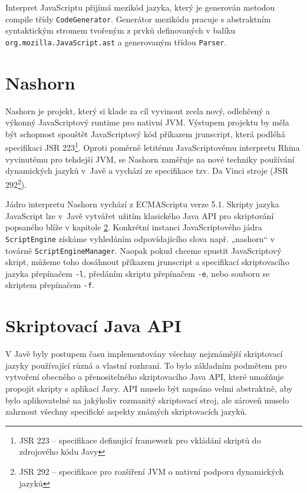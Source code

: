 Interpret JavaScriptu přijímá mezikód jazyka, který je generován metodou compile třídy \texttt{CodeGenerator}. Generátor mezikódu pracuje s abstraktním syntaktickým stromem tvořeným z prvků definovaných v balíku \texttt{org.mozilla.JavaScript.ast} a generovaným třídou \texttt{Parser}.

\section{Nashorn}
\label{Chapter.JavaScriptInJavaAnalysis.Nashorn}

Nashorn je projekt, který si klade za cíl vyvinout zcela nový, odlehčený a výkonný JavaScriptový runtime pro nativní JVM. Výstupem projektu by měla být schopnost spouštět JavaScriptový kód příkazem jrunscript, která podléhá specifikaci JSR 223\footnote{JSR 223 -- specifikace definující framework pro vkládání skriptů do zdrojového kódu Javy}. Oproti poměrně letitému JavaScriptovému interpretu Rhina vyvinutému pro tehdejší JVM, se Nashorn zaměřuje na nové techniky používání dynamických jazyků v~Javě a vychází ze specifikace \linebreak tzv. Da Vinci stroje (JSR 292\footnote{JSR 292 -- specifikace pro rozšíření JVM o nativní podporu dynamických jazyků}). \cite{Bibliography.Nashorn.Project}

Jádro interpretu Nashorn vychází z ECMAScriptu verze 5.1. Skripty jazyka JavaScript lze v~Javě vytvářet užitím klasického Java API pro skriptování popsaného blíže v kapitole \ref{Chapter.JavaScriptInJavaAnalysis.ScriptingJavaAPI}. Konkrétní instanci JavaScriptového jádra \texttt{ScriptEngine} získáme vyhledáním odpovídajícího slova např. „nashorn“ v továrně \texttt{ScriptEngineManager}. Naopak pokud chceme spustit JavaScriptový skript, můžeme toho dosáhnout příkazem jrunscript a specifikací skriptovacího jazyka přepínačem \texttt{-l}, předáním skriptu přepínačem \texttt{-e}, nebo souboru se skriptem přepínačem \texttt{-f}.

\section{Skriptovací Java API}
\label{Chapter.JavaScriptInJavaAnalysis.ScriptingJavaAPI}

V Javě byly postupem času implementovány všechny nejznámější skriptovací jazyky používající různá a vlastní rozhraní. To bylo základním podmětem pro vytvoření obecného a přenositelného skriptovacího Java API, které umožňuje propojit skripty s aplikací Javy. API muselo být napsáno velmi abstraktně, aby bylo aplikovatelné na jakýkoliv rozmanitý skriptovací stroj, ale zároveň muselo zahrnout všechny specifické aspekty známých skriptovacích jazyků. \cite{Bibliography.JavaAPI.Script.Book}

